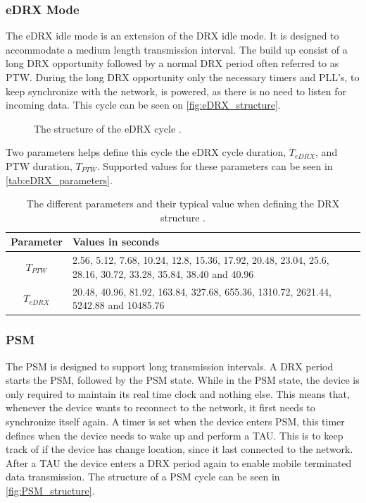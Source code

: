 \subsubsection{eDRX Mode}
The eDRX idle mode is an extension of the DRX idle mode. It is designed to accommodate a medium length transmission interval. The build up consist of a long DRX opportunity followed by a normal DRX period often referred to as \gls{PTW}. During the long DRX opportunity only the necessary timers and \gls{PLL}'s, to keep synchronize with the network, is powered, as there is no need to listen for incoming data. This cycle can be seen on \autoref{fig:eDRX_structure}.

\begin{figure}[H]
\centering
\resizebox{\textwidth}{!}{
}
\caption{The structure of the \gls{eDRX} cycle \citep{NB-IoT_Book}.}
\label{fig:eDRX_structure}
\end{figure}

Two parameters helps define this cycle the eDRX cycle duration, $T_{eDRX}$, and \gls{PTW} duration, $T_{PTW}$. Supported values for these parameters can be seen in \autoref{tab:eDRX_parameters}.

\begin{table}[H]
\centering
\begin{tabular}{|c|p{8cm}|} \hline
\textbf{Parameter} & \textbf{Values in seconds} \\ \hline 
$T_{PTW}$ & 2.56, 5.12, 7.68, 10.24, 12.8, 15.36, 17.92, 20.48, 23.04, 25.6, 28.16, 30.72, 33.28, 35.84, 38.40 and 40.96\\ \hline
$T_{eDRX}$ & 20.48, 40.96, 81.92, 163.84, 327.68, 655.36, 1310.72, 2621.44, 5242.88 and 10485.76 \\ \hline
\end{tabular}
\caption{The different parameters and their typical value when defining the DRX structure \citep{book_LTE_for_UMTS}.}
\label{tab:eDRX_parameters}
\end{table}

\subsubsection{PSM}
The PSM is designed to support long transmission intervals. A DRX period starts the PSM, followed by the PSM state. While in the PSM state, the device is only required to maintain its real time clock and nothing else. This means that, whenever the device wants to reconnect to the network, it first needs to synchronize itself again. A timer is set when the device enters PSM, this timer defines when the device needs to wake up and perform a \gls{TAU}. This is to keep track of if the device has change location, since it last connected to the network. After a TAU the device enters a DRX period again to enable mobile terminated data transmission. The structure of a PSM cycle can be seen in \autoref{fig:PSM_structure}.

